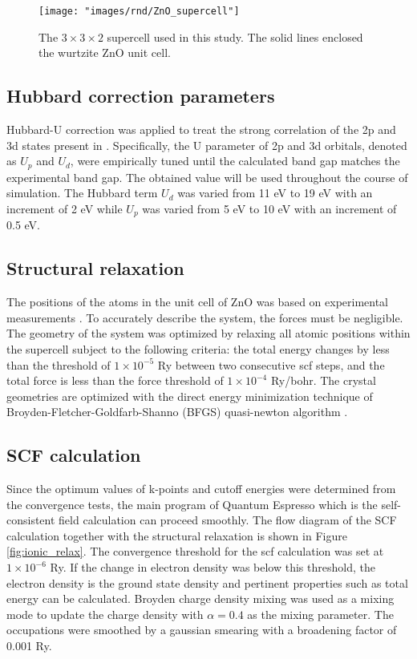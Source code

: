 \begin{figure}[tbh!]
	\centering
	\texttt{[image: "images/rnd/ZnO\_supercell"]}
	\caption[The $3 \times 3 \times 2$ supercell used in this study]{The $3 \times 3 \times 2$ supercell used in this study. The solid lines enclosed the wurtzite ZnO unit cell. }
	\label{fig:zno_supercell}
\end{figure}


\subsection{Hubbard correction parameters}
Hubbard-U correction was applied to treat the strong correlation of the 2p and 3d states present in . Specifically, the U parameter of 2p and 3d orbitals, denoted as $U_{p}$ and $U_{d}$, were empirically tuned until the calculated band gap matches the experimental band gap. The obtained value will be used throughout the course of simulation.  The Hubbard term $U_d$ was varied from 11 eV to 19 eV with an increment of 2 eV while $U_p$ was varied from 5 eV to 10 eV with an increment of 0.5 eV.

\subsection{Structural relaxation}
The positions of the atoms in the unit cell of ZnO was based on experimental measurements \citep{Sabine1969}.  To accurately describe the system, the forces must be negligible. The geometry of the system was optimized by relaxing all atomic positions within the supercell subject to the following criteria: the total energy changes by less than the threshold of $1 \times 10^{-5}$ Ry between two consecutive scf steps, and the total force is less than the force threshold of $1 \times 10^{-4}$ Ry/bohr. The crystal  geometries are optimized with the direct energy minimization technique of Broyden-Fletcher-Goldfarb-Shanno (BFGS) quasi-newton algorithm \citep{Broyden1970,Fletcher1970,Goldfarb1970,Shanno1970}.

\subsection{SCF calculation}
Since the optimum values of k-points and cutoff energies were determined from the convergence tests, the main program of Quantum Espresso which is the self-consistent field calculation can proceed smoothly. The flow diagram of the SCF calculation together with the structural relaxation is shown in Figure \ref{fig:ionic_relax}. The convergence threshold for the scf calculation was set at $1 \times 10^{-6}$ Ry. If the change in electron density was below this threshold, the electron density is the ground state density and pertinent properties such as total energy can be calculated. Broyden charge density mixing \citep{Broyden1965} was used as a mixing mode to update the charge density with  $\alpha = 0.4$ as the mixing parameter.   The occupations were smoothed by a gaussian smearing with a broadening factor of 0.001 Ry.

